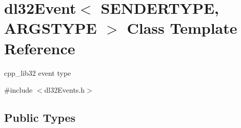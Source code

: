 \hypertarget{classdl32_event}{\section{dl32\-Event$<$ S\-E\-N\-D\-E\-R\-T\-Y\-P\-E, A\-R\-G\-S\-T\-Y\-P\-E $>$ Class Template Reference}
\label{classdl32_event}
}


cpp\-\_\-lib32 event type  




{\ttfamily \#include $<$dl32\-Events.\-h$>$}

\subsection*{Public Types}
